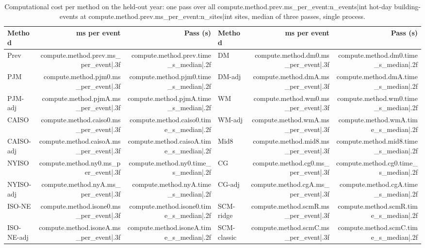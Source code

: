 \begin{table}[htbp]
\centering
\caption{Computational cost per method on the held-out year: one pass over all {{compute.method.prev.ms_per_event:n_events|int}} hot-day building-events at {{compute.method.prev.ms_per_event:n_sites|int}} sites, median of three passes, single process.}\label{tabS:cost}
\small
\begin{tabular}{@{}lrr@{\hspace{2.5em}}lrr@{}}
\toprule
Method & ms per event & Pass (s) & Method & ms per event & Pass (s) \\
\midrule
Prev & {{compute.method.prev.ms_per_event|.3f}} & {{compute.method.prev.time_s_median|.2f}} & DM & {{compute.method.dm0.ms_per_event|.3f}} & {{compute.method.dm0.time_s_median|.2f}} \\
PJM & {{compute.method.pjm0.ms_per_event|.3f}} & {{compute.method.pjm0.time_s_median|.2f}} & DM-adj & {{compute.method.dmA.ms_per_event|.3f}} & {{compute.method.dmA.time_s_median|.2f}} \\
PJM-adj & {{compute.method.pjmA.ms_per_event|.3f}} & {{compute.method.pjmA.time_s_median|.2f}} & WM & {{compute.method.wm0.ms_per_event|.3f}} & {{compute.method.wm0.time_s_median|.2f}} \\
CAISO & {{compute.method.caiso0.ms_per_event|.3f}} & {{compute.method.caiso0.time_s_median|.2f}} & WM-adj & {{compute.method.wmA.ms_per_event|.3f}} & {{compute.method.wmA.time_s_median|.2f}} \\
CAISO-adj & {{compute.method.caisoA.ms_per_event|.3f}} & {{compute.method.caisoA.time_s_median|.2f}} & Mid8 & {{compute.method.mid8.ms_per_event|.3f}} & {{compute.method.mid8.time_s_median|.2f}} \\
NYISO & {{compute.method.ny0.ms_per_event|.3f}} & {{compute.method.ny0.time_s_median|.2f}} & CG & {{compute.method.cg0.ms_per_event|.3f}} & {{compute.method.cg0.time_s_median|.2f}} \\
NYISO-adj & {{compute.method.nyA.ms_per_event|.3f}} & {{compute.method.nyA.time_s_median|.2f}} & CG-adj & {{compute.method.cgA.ms_per_event|.3f}} & {{compute.method.cgA.time_s_median|.2f}} \\
ISO-NE & {{compute.method.isone0.ms_per_event|.3f}} & {{compute.method.isone0.time_s_median|.2f}} & SCM-ridge & {{compute.method.scmR.ms_per_event|.3f}} & {{compute.method.scmR.time_s_median|.2f}} \\
ISO-NE-adj & {{compute.method.isoneA.ms_per_event|.3f}} & {{compute.method.isoneA.time_s_median|.2f}} & SCM-classic & {{compute.method.scmC.ms_per_event|.3f}} & {{compute.method.scmC.time_s_median|.2f}} \\

\end{tabular}
\end{table}

